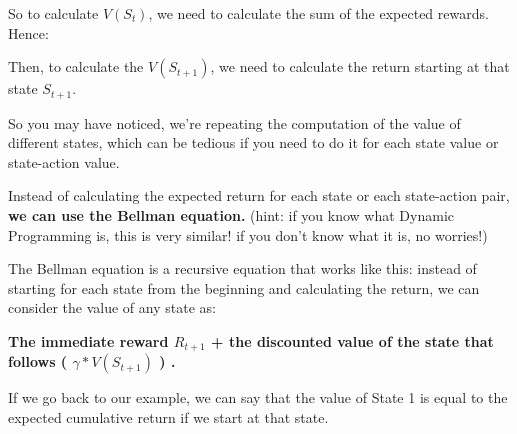 \documentclass[11pt,a4paper]{article}
\begin{document}
So to calculate \(V(S_t)\), we need to calculate the sum of the expected rewards. Hence:


Then, to calculate the \(V(S_{t+1})\), we need to calculate the return starting at that state \(S_{t+1}\).


So you may have noticed, we're repeating the computation of the value of different states, which can be tedious if you need to do it for each state value or state-action value.

Instead of calculating the expected return for each state or each state-action pair, \textbf{we can use the Bellman equation.} (hint: if you know what Dynamic Programming is, this is very similar! if you don't know what it is, no worries!)

The Bellman equation is a recursive equation that works like this: instead of starting for each state from the beginning and calculating the return, we can consider the value of any state as:

\textbf{The immediate reward \(R_{t+1}\) + the discounted value of the state that follows ( \(\gamma * V(S_{t+1})\) ) .}


If we go back to our example, we can say that the value of State 1 is equal to the expected cumulative return if we start at that state.

\end{document}
